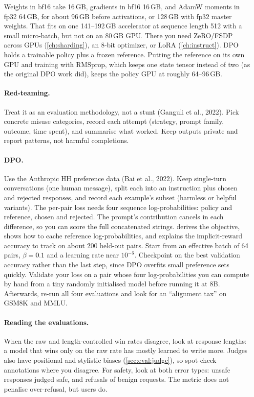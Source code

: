 \begin{napkinmath}
Weights in bf16 take 16\,GB, gradients in bf16 16\,GB, and AdamW moments in fp32 64\,GB, for about
96\,GB before activations, or 128\,GB with fp32 master weights. That fits on one 141--192\,GB
accelerator at sequence length 512 with a small micro-batch, but not on an 80\,GB GPU. There you need
ZeRO/FSDP across GPUs (\cref{ch:sharding}), an 8-bit optimizer, or LoRA (\cref{ch:instruct}). DPO holds a
trainable policy plus a frozen reference. Putting the reference on its own GPU and training with
RMSprop, which keeps one state tensor instead of two (as the original DPO work did), keeps the policy
GPU at roughly 64--96\,GB.
\end{napkinmath}

\paragraph{Red-teaming.} Treat it as an evaluation methodology, not a stunt (Ganguli et al., 2022).
Pick concrete misuse categories, record each attempt (strategy, prompt family, outcome, time spent),
and summarise what worked. Keep outputs private and report patterns, not harmful completions.

\paragraph{DPO.} Use the Anthropic HH preference data (Bai et al., 2022). Keep single-turn
conversations (one human message), split each into an instruction plus chosen and rejected responses,
and record each example's subset (harmless or helpful variants). The per-pair loss needs four sequence
log-probabilities: policy and reference, chosen and rejected. The prompt's contribution cancels in each
difference, so you can score the full concatenated strings.  derives the objective, shows
how to cache reference log-probabilities, and explains the implicit-reward accuracy to track on about
200 held-out pairs. Start from an effective batch of 64 pairs, $\beta=0.1$ and a learning rate near
$10^{-6}$. Checkpoint on the best validation accuracy rather than the last step, since DPO overfits small
preference sets quickly. Validate your loss on a pair whose four log-probabilities you can compute by
hand from a tiny randomly initialised model before running it at 8B. Afterwards, re-run all four
evaluations and look for an ``alignment tax'' on GSM8K and MMLU.

\paragraph{Reading the evaluations.} When the raw and length-controlled win rates disagree, look at
response lengths: a model that wins only on the raw rate has mostly learned to write more. Judges also
have positional and stylistic biases (\cref{sec:eval:judge}), so spot-check annotations where you
disagree. For safety, look at both error types: unsafe responses judged safe, and refusals of benign
requests. The metric does not penalise over-refusal, but users do.

